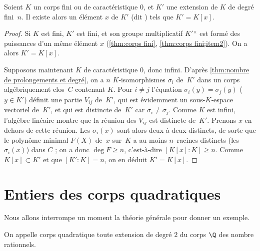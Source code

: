 \documentclass[11pt, useosf,
  title in boldface,
  theorem in new line,
  theorem numbering = section,
  number theorems separately,
]{simplivre}
\begin{document}
    \begin{corollary}\label{cor:théorème de l'élément primitif}
        Soient \( K \) un corps fini ou de caractéristique \( 0 \), et \( K' \) une extension de \( K \) de degré fini~\( n \). Il existe alors un élément \( x \) de \( K' \) (dit ) tels que \( K' = K[x] \).
    \end{corollary}
    \begin{proof}
        Si \( K \) est fini, \( K' \) est fini, et son groupe multiplicatif \( K'{}^\times \) est formé des puissances d'un même élément \( x \) (\cref{thm:corps fini}, \ref{thm:corps fini;item2}). On a alors \( K' = K[x] \).

        Supposons maintenant \( K \) de caractéristique \( 0 \), donc infini. D'après \cref{thm:nombre de prolongements et degré}, on a \( n \) \( K \)‑isomorphismes \( \sigma_i \) de~\( K' \) dans un corps algébriquement clos~\( C \) contenant \( K \). Pour \( i \neq j \) l'équation \( \sigma_i(y) = \sigma_j(y) \) (\( y \in K' \)) définit une partie \( V_{ij} \) de~\( K' \), qui est évidemment un sous-\( K \)‑espace vectoriel de~\( K' \), et qui est distincte de~\( K' \) car \( \sigma_i \neq \sigma_j \). Comme \( K \) est infini, l'algèbre linéaire montre que la réunion des \( V_{ij} \) est distincte de~\( K' \). Prenons \( x \) en dehors de cette réunion. Les \( \sigma_i(x) \) sont alors deux à deux distincts, de sorte que le polynôme minimal \( F(X) \) de~\( x \) sur~\( K \) a au moins \( n \)~racines distincts (les \( \sigma_i(x) \)) dans \( C \) ; on a donc \( \deg F \geqslant n \), c'est-à-dire \( [K[x]:K] \geqslant n \). Comme \( K[x] \subset K' \) et que \( [K':K] = n \), on en déduit \( K' = K[x] \).
    \end{proof}

\section{Entiers des corps quadratiques}\label{sec:entiers des corps quadratiques}

    Nous allons interrompe un moment la théorie générale pour donner un exemple.

    \begin{definition}
        On appelle corps quadratique toute extension de degré \( 2 \) du corps \( \Q \) des nombre rationnels.
    \end{definition}
\end{document}
